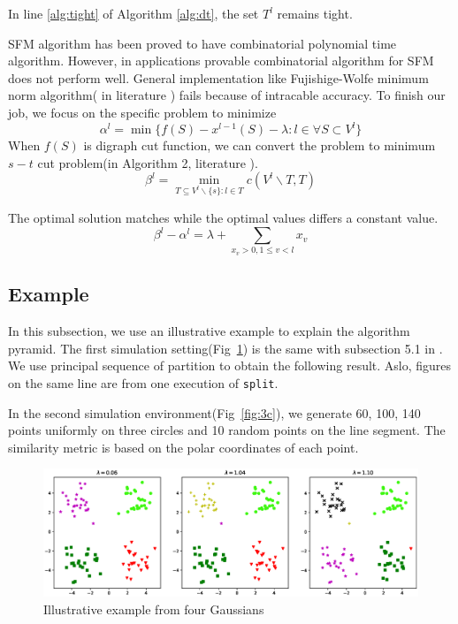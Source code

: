 \documentclass{article}
\begin{document}
In line \ref{alg:tight} of Algorithm \ref{alg:dt}, the set $T^l$ remains tight.

SFM algorithm has been proved to have combinatorial polynomial time algorithm. However, in applications provable combinatorial algorithm for SFM does not perform well. General implementation like Fujishige-Wolfe minimum norm algorithm( in literature \cite{fwrobust}) fails because of intracable accuracy.
To finish our job, we focus on the specific problem to minimize 
\begin{equation}
\alpha^l = \min \{ f(S) - x^{l-1}(S) - \lambda: l \in \forall S \subset V^l\}
\end{equation}
When $f(S)$ is digraph cut function, we can convert the problem to minimum $s-t$ cut problem(in Algorithm 2, literature \cite{pin}). 
\begin{equation}
\beta^l = \min_{T \subseteq V^l \backslash \{s\}: l \in T} c(V^l \backslash T, T)
\end{equation} 

The optimal solution matches while the optimal values differs a constant value. 
\begin{equation}
\beta^l - \alpha^l = \lambda + \sum_{x_v>0, 1\leq v<l}x_{v}
\end{equation} 
\subsection{Example}

In this subsection, we use an illustrative example to explain the algorithm pyramid.
The first simulation setting(Fig~\ref{fig:4p}) is the same with subsection 5.1 in \cite{mac}.  We use principal sequence of partition to obtain the following result.
Aslo, figures on the same line are from one execution of \texttt{split}.

In the second simulation environment(Fig~\ref{fig:3c}), we generate 60, 100, 140 points uniformly on three circles and 10 random points on the line segment. The similarity metric is based on the polar coordinates of each point.

\begin{figure}[!ht]
\includegraphics[width=12cm]{pic/4part.eps}
\caption{Illustrative example from four Gaussians}\label{fig:4p}
\end{figure}
\end{document}
